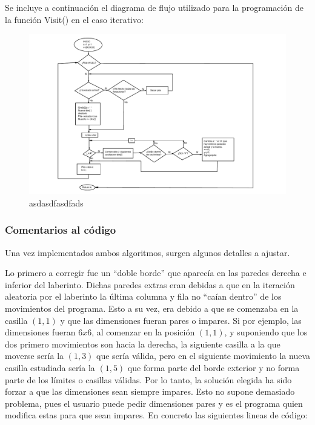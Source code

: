 \documentclass[12pt,a4paper]{article}
\begin{document}
Se incluye a continuación el diagrama de flujo utilizado para la programación de la función \textsf{Visit()} en el caso iterativo:

\begin{figure}[H]
	\hspace{-4.3cm}
	\includegraphics[scale=1.05]{fotos/diagrama.pdf}
	\caption{asdasdfasdfads}
	\label{diagrama}
\end{figure}

\subsubsection{Comentarios al código}

Una vez implementados ambos algoritmos, surgen algunos detalles a ajustar.

Lo primero a corregir fue un ``doble borde'' que aparecía en las paredes derecha e inferior del laberinto. Dichas paredes extras eran debidas a que en la iteración aleatoria por el laberinto la última columna y fila no ``caían dentro'' de los movimientos del programa. Esto a su vez, era debido a que se comenzaba en la casilla $(1,1)$ y que las dimensiones fueran pares o impares. Si por ejemplo, las dimensiones fueran $6x6$, al comenzar en la posición $(1,1)$, y suponiendo que los dos primero movimientos son hacia la derecha, la siguiente casilla a la que moverse sería la $(1,3)$ que sería válida, pero en el siguiente movimiento la nueva casilla estudiada sería la $(1,5)$ que forma parte del borde exterior y no forma parte de los límites o casillas válidas. Por lo tanto, la solución elegida ha sido forzar a que las dimensiones sean siempre impares. Esto no supone demasiado problema, pues el usuario puede pedir dimensiones pares y es el programa quien modifica estas para que sean impares. En concreto las siguientes lineas de código:
\end{document}
